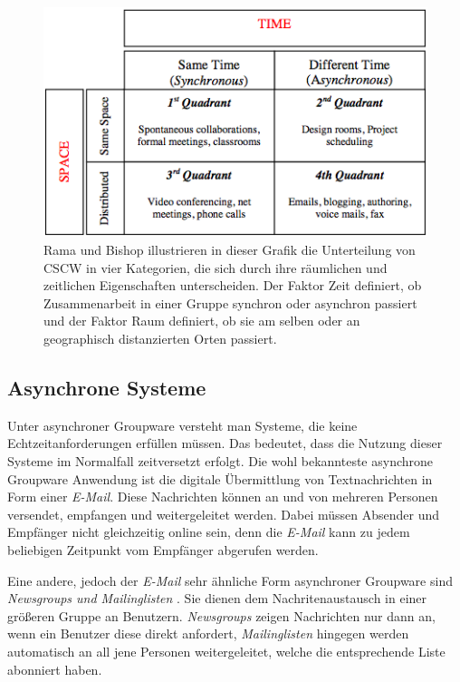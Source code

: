 \begin{figure}[bth]
	\includegraphics[width=\textwidth]{gfx/ramaCSCWQuadranten.png}
	\caption{Rama und Bishop \citep{Rama:2006p245} illustrieren in dieser Grafik die Unterteilung von CSCW in vier Kategorien, die sich durch ihre räumlichen und zeitlichen Eigenschaften unterscheiden. Der Faktor Zeit definiert, ob Zusammenarbeit in einer Gruppe synchron oder asynchron passiert und der Faktor Raum definiert, ob sie am selben oder an geographisch distanzierten Orten passiert.}
	\label{fig:ramaCSCW}
\end{figure}


\subsection{Asynchrone Systeme}

Unter asynchroner Groupware versteht man Systeme, die keine Echtzeitanforderungen erfüllen müssen. Das bedeutet, dass die Nutzung dieser Systeme im Normalfall zeitversetzt erfolgt. Die wohl bekannteste asynchrone Groupware Anwendung ist die digitale Übermittlung von Textnachrichten in Form einer \emph{E-Mail}. Diese Nachrichten können an und von mehreren Personen versendet, empfangen und weitergeleitet werden. Dabei müssen Absender und Empfänger nicht gleichzeitig online sein, denn die \emph{E-Mail} kann zu jedem beliebigen Zeitpunkt vom Empfänger abgerufen werden.

Eine andere, jedoch der \emph{E-Mail} sehr ähnliche Form asynchroner Groupware sind \emph{Newsgroups und Mailinglisten} \citep{Gerlicher:2007p241}. Sie dienen dem Nachritenaustausch in einer größeren Gruppe an Benutzern. \emph{Newsgroups} zeigen Nachrichten nur dann an, wenn ein Benutzer diese direkt anfordert, \emph{Mailinglisten} hingegen werden automatisch an all jene Personen weitergeleitet, welche die entsprechende Liste abonniert haben.


